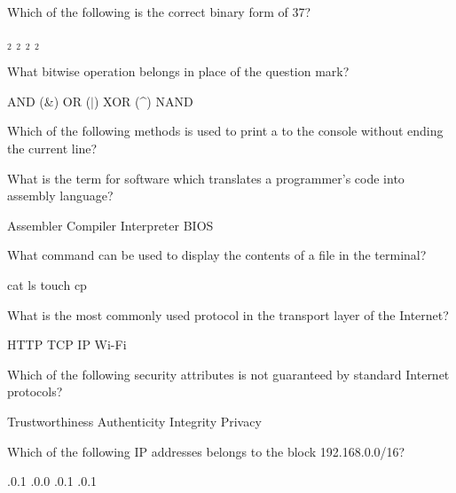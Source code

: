\documentclass[answers,addpoints]{exam} %
\begin{document}
\begin{questions}
\question[2] Which of the following is the correct binary form of 37?
\begin{choices}
    $_2$
    $_2$
    $_2$
    $_2$
\end{choices}

\question[2] What bitwise operation belongs in place of the question mark?
\begin{center}
\end{center}
\begin{choices}
    \choice AND (\&)
    \choice OR ($|$)
    \CorrectChoice XOR (\textasciicircum)
    \choice NAND
\end{choices}

\question[2] Which of the following methods is used to print a  to the console without ending the current line?
\begin{choices}
    \choice {}
    \choice {}
    \choice {}
    \CorrectChoice {}
\end{choices}

\question[2] What is the term for software which translates a programmer's code into assembly language?
\begin{choices}
    \choice Assembler
    \CorrectChoice Compiler
    \choice Interpreter
    \choice BIOS
\end{choices}

\question[2] What command can be used to display the contents of a file in the terminal?
\begin{choices}
    \CorrectChoice cat
    \choice ls
    \choice touch
    \choice cp
\end{choices}

\question[2] What is the most commonly used protocol in the transport layer of the Internet?
\begin{choices}
    \choice HTTP
    \CorrectChoice TCP
    \choice IP
    \choice Wi-Fi
\end{choices}

\question[2] Which of the following security attributes is not guaranteed by standard Internet protocols?
\begin{choices}
    \CorrectChoice Trustworthiness
    \choice Authenticity
    \choice Integrity
    \choice Privacy
\end{choices}

\question[2] Which of the following IP addresses belongs to the block 192.168.0.0/16?
\begin{choices}
    .0.1
    .0.0
    .0.1
    .0.1
\end{choices}


\end{questions}
\end{document}
